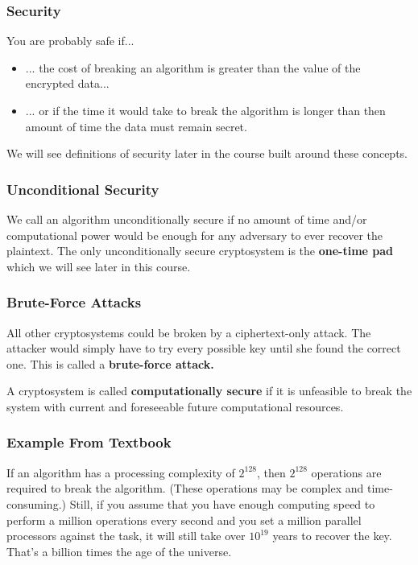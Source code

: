 \documentclass{beamer}
\newcommand{\<}{\langle}
\renewcommand{\>}{\rangle}
\begin{document}
\begin{frame}
\frametitle{Security}

You are probably safe if... 
\begin{itemize}
\item ... the cost of breaking an algorithm is greater than the value of the encrypted data...
\item ... or if the time it would take to break the algorithm is longer than then amount of time the data must remain secret.
\end{itemize}

We will see definitions of security later in the course built around these concepts.
\end{frame}

\begin{frame}
\frametitle{Unconditional Security}

We call an algorithm unconditionally secure if no amount of time and/or computational power would be enough for any adversary to ever recover the plaintext. The only unconditionally secure cryptosystem is the \textbf{one-time pad} which we will see later in this course.
\end{frame}

\begin{frame}
\frametitle{Brute-Force Attacks}

All other cryptosystems could be broken by a ciphertext-only attack. The attacker would simply have to try every possible key until she found the correct one. This is called a \textbf{brute-force attack.}\newline

A cryptosystem is called \textbf{computationally secure} if it is unfeasible to break the system with current and foreseeable future computational resources. 
\end{frame}

\begin{frame}
\frametitle{Example From Textbook}

If an algorithm has a processing complexity of $2^{128}$, then $2^{128}$ operations are required to break the algorithm. (These operations may be complex and time-consuming.) Still, if you assume that you have enough computing speed to perform a million operations every second and you set a million parallel processors against the task, it will still take over $10^{19}$ years to recover the key. That's a billion times the age of the universe.
\end{frame}
\end{document}
